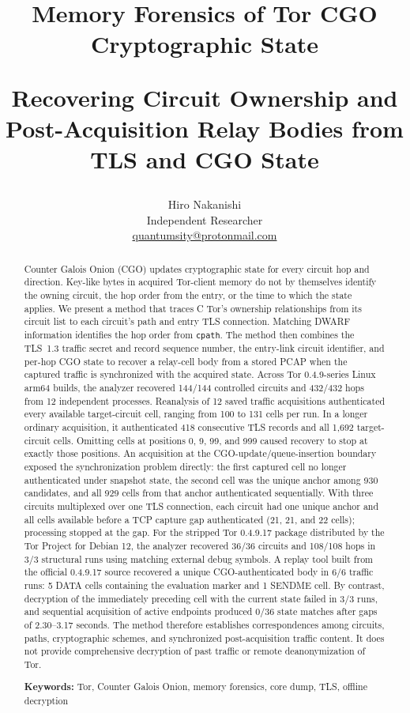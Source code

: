 \documentclass[10pt,a4paper]{article}
\title{\vspace{-8mm}
  \textbf{Memory Forensics of Tor CGO Cryptographic State}\par
  \large Recovering Circuit Ownership and Post-Acquisition Relay Bodies from TLS and CGO State}
\author{Hiro Nakanishi\\Independent Researcher\\\href{mailto:quantumsity@protonmail.com}{quantumsity@protonmail.com}}
\date{}
\newcommand{\code}[1]{\nolinkurl{#1}}
\begin{document}
\maketitle
\vspace{-5mm}

\begin{abstract}
Counter Galois Onion (CGO) updates cryptographic state for every circuit hop and direction.
Key-like bytes in acquired Tor-client memory do not by themselves identify the owning circuit, the hop order from the entry, or the time to which the state applies.
We present a method that traces C Tor's ownership relationships from its circuit list to each circuit's path and entry TLS connection. Matching DWARF information identifies the hop order from \code{cpath}. The method then combines the TLS~1.3 traffic secret and record sequence number, the entry-link circuit identifier, and per-hop CGO state to recover a relay-cell body from a stored PCAP when the captured traffic is synchronized with the acquired state.
Across Tor 0.4.9-series Linux arm64 builds, the analyzer recovered 144/144 controlled circuits and 432/432 hops from 12 independent processes. Reanalysis of 12 saved traffic acquisitions authenticated every available target-circuit cell, ranging from 100 to 131 cells per run. In a longer ordinary acquisition, it authenticated 418 consecutive TLS records and all 1,692 target-circuit cells. Omitting cells at positions 0, 9, 99, and 999 caused recovery to stop at exactly those positions.
An acquisition at the CGO-update/queue-insertion boundary exposed the synchronization problem directly: the first captured cell no longer authenticated under snapshot state, the second cell was the unique anchor among 930 candidates, and all 929 cells from that anchor authenticated sequentially. With three circuits multiplexed over one TLS connection, each circuit had one unique anchor and all cells available before a TCP capture gap authenticated (21, 21, and 22 cells); processing stopped at the gap.
For the stripped Tor 0.4.9.17 package distributed by the Tor Project for Debian 12, the analyzer recovered 36/36 circuits and 108/108 hops in 3/3 structural runs using matching external debug symbols. A replay tool built from the official 0.4.9.17 source recovered a unique CGO-authenticated body in 6/6 traffic runs: 5 DATA cells containing the evaluation marker and 1 SENDME cell.
By contrast, decryption of the immediately preceding cell with the current state failed in 3/3 runs, and sequential acquisition of active endpoints produced 0/36 state matches after gaps of 2.30--3.17 seconds.
The method therefore establishes correspondences among circuits, paths, cryptographic schemes, and synchronized post-acquisition traffic content. It does not provide comprehensive decryption of past traffic or remote deanonymization of Tor.

\noindent\textbf{Keywords:} Tor, Counter Galois Onion, memory forensics, core dump, TLS, offline decryption
\end{abstract}
\end{document}
